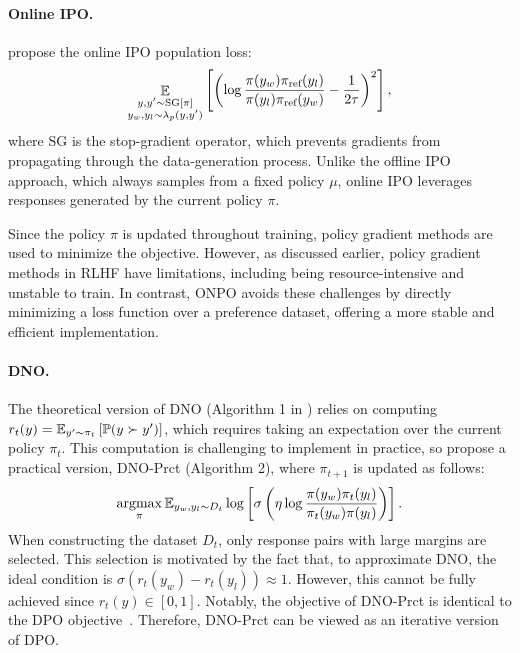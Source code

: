 \paragraph{Online IPO.}\citet{calandriello2024human} propose the online IPO population loss:
\begin{align*}
\mathop{\mathbb{E}}_{\substack{y, y' \sim {\mathrm{SG}[\pi]} \\ y_w, y_l \sim \lambda_p(y, y')}}\left[\left(\log{\frac{\pi(y_w)\pi_{\textrm{ref}}(y_l)}{\pi(y_l)\pi_{\textrm{ref}}(y_w)}}-\frac{1}{2 \tau}\right)^2\right],
\end{align*}
where $\mathrm{SG}$ is the stop-gradient operator, which prevents gradients from propagating through the data-generation process. Unlike the offline IPO approach, which always samples from a fixed policy $\mu$, online IPO leverages responses generated by the current policy $\pi$. 

Since the policy $\pi$ is updated throughout training, policy gradient methods are used to minimize the objective. However, as discussed earlier, policy gradient methods in RLHF have limitations, including being resource-intensive and unstable to train. In contrast, ONPO avoids these challenges by directly minimizing a loss function over a preference dataset, offering a more stable and efficient implementation.

\paragraph{DNO.} The theoretical version of DNO (Algorithm 1 in \citet{rosset2024direct}) relies on computing $r_t(y)=\mathbb{E}_{y' \sim \pi_t}\left[\mathbb{P}(y \succ y')\right]$, which requires taking an expectation over the current policy $\pi_t$. This computation is challenging to implement in practice, so \citet{rosset2024direct} propose a practical version, DNO-Prct (Algorithm 2), where $\pi_{t+1}$ is updated as follows:
\begin{align*}
\mathop{\mathrm{argmax}}_{\pi} \mathbb{E}_{y_w,y_l \sim D_t} \log \left[\sigma\left(\eta \log\frac{\pi(y_w)\pi_t(y_l)}{\pi_t(y_w)\pi(y_l)}\right)\right].
\end{align*}
When constructing the dataset $D_t$, only response pairs with large margins are selected. This selection is motivated by the fact that, to approximate DNO, the ideal condition is $\sigma(r_t(y_w) - r_t(y_l)) \approx 1$. However, this cannot be fully achieved since $r_t(y) \in [0, 1]$. Notably, the objective of DNO-Prct is identical to the DPO objective~\citep{rafailov2024direct}. Therefore, DNO-Prct can be viewed as an iterative version of DPO.

